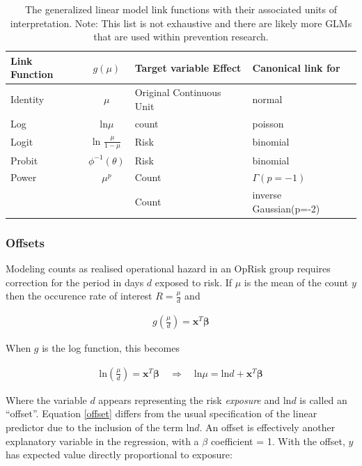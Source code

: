 \documentclass{DissertateUSU}
\begin{document}
\begin{table}[tb]
\centering
\caption{The generalized linear model link functions with their associated units of interpretation. Note: This list is not exhaustive and there are likely more GLMs that are used within prevention research.} 
\label{tab_linkfcn}
\begin{tabular}{lcll}
\toprule
Link Function & $g(\mu)$ & Target variable Effect & Canonical link for \\ 
\midrule
Identity & $\mu$ & Original Continuous Unit & normal \\ 
  Log & ln$\mu$ & count & poisson \\ 
  Logit & ln $\frac{\mu}{1-\mu}$ & Risk & binomial \\ 
  Probit & $\phi^{-1}(\theta)$ & Risk & binomial \\ 
  Power & $\mu^p$ & Count & $\Gamma(p=-1)$\\
        &       & Count & inverse Gaussian(p=-2)\\
\bottomrule
\end{tabular}
\end{table}

\subsubsection{Offsets}

Modeling counts as realised operational hazard in an OpRisk group
requires correction for the period in days \(d\) exposed to risk. If
\(\mu\) is the mean of the count \(y\) then the occurence rate of
interest \(R= \frac{\mu}{d}\) and

\singlespacing

\begin{eqnarray}
g\left(\frac{\mu}{d}\right) = \mathbf{x}^T\mathbf{\beta}
\end{eqnarray} \doublespacing

When \(g\) is the log function, this becomes

\singlespacing

\begin{eqnarray}\label{offset}
\mbox{ln}\left(\frac{\mu}{d}\right) = \mathbf{x}^T\mathbf{\beta} \quad \Rightarrow \quad \mbox{ln}\mu = \mbox{ln}d + \mathbf{x}^T\mathbf{\beta}
\end{eqnarray} \doublespacing

Where the variable \(d\) appears representing the risk \emph{exposure}
and ln\(d\) is called an ``offset''. Equation \ref{offset} differs from
the usual specification of the linear predictor due to the inclusion of
the term ln\(d\). An offset is effectively another explanatory variable
in the regression, with a \(\beta\) coefficient = 1. With the offset,
\(y\) has expected value directly proportional to exposure:
\end{document}
